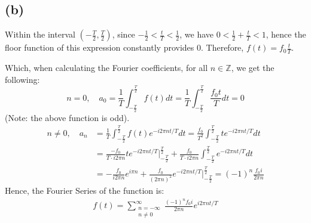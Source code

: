 \documentclass{article}
\newcommand{\ZZ}{\mathbb{Z}}
\begin{document}
\subsection*{(b)}
Within the interval $(-\frac{T}{2},\frac{T}{2})$, since $-\frac{1}{2}<\frac{t}{T}<\frac{1}{2} $, we have $0<\frac{1}{2}+\frac{t}{T}<1$, hence the floor function of this expression constantly provides $0$. Therefore, $f(t) = f_0\frac{t}{T}$.

Which, when calculating the Fourier coefficients, for all $n\in \ZZ$, we get the following:
\begin{equation}
    n=0,\quad a_0 = \frac{1}{T}\int_{-\frac{T}{2}}^\frac{T}{2}f(t)dt = \frac{1}{T}\int_{-\frac{T}{2}}^\frac{T}{2}\frac{f_0t}{T}dt = 0
\end{equation}
(Note: the above function is odd).
\begin{align}
    n\neq 0,\quad a_n &= \frac{1}{T}\int_{-\frac{T}{2}}^\frac{T}{2}f(t)e^{-i2\pi nt/T}dt = \frac{f_0}{T^2}\int_{-\frac{T}{2}}^\frac{T}{2}te^{-i2\pi nt/T}dt\\
    &=\frac{-f_0}{T\cdot i2\pi n}te^{-i2\pi nt/T}\bigg|_{-\frac{T}{2}}^\frac{T}{2} + \frac{f_0}{T\cdot i2\pi n}\int_{-\frac{T}{2}}^\frac{T}{2}e^{-i2\pi nt/T}dt\\
    &= -\frac{f_0}{i2\pi n}e^{i\pi n} +\frac{f_0}{(2\pi n)^2}e^{-i2\pi nt/T}\bigg|_{-\frac{T}{2}}^\frac{T}{2} = (-1)^{n}\frac{f_0 i}{2\pi n}
\end{align}
Hence, the Fourier Series of the function is:
\begin{align}
    f(t) = \sum_{\substack{n=-\infty\\n\neq 0}}^{\infty}\frac{(-1)^n f_0i}{2\pi n}e^{i2\pi nt/T}
\end{align}

\hfil
\end{document}
